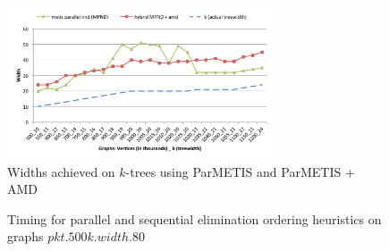 \documentclass[conference]{IEEEtran}
\begin{document}


\begin{figure}[!ht]
\includegraphics[angle=0,width=3.1in]{figures/newfig6_col.pdf}
\caption{Widths achieved on $k$-trees using ParMETIS and ParMETIS + AMD}
\label{fig:eo_width}
\end{figure}

\begin{figure}[!ht]
\caption{Timing for parallel and sequential elimination ordering heuristics on graphs $pkt.500k.width.80$}
\label{fig:test_eo_width}
\end{figure}
\end{document}
